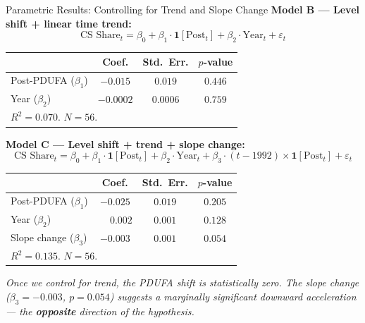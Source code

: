 \documentclass[10pt]{beamer}
\begin{document}
\begin{frame}[t]{Parametric Results: Controlling for Trend and Slope Change}
  \textbf{Model B --- Level shift + linear time trend:}
  \[
    \text{CS Share}_t = \beta_0 + \beta_1 \cdot \mathbf{1}[\text{Post}_t]
                        + \beta_2 \cdot \text{Year}_t + \varepsilon_t
  \]
  \begin{center}
  \begin{tabular}{lccc}
    \hline
    & Coef. & Std.\ Err. & $p$-value \\
    \hline
    Post-PDUFA ($\beta_1$) & $-0.015$ & $0.019$ & $0.446$ \\
    Year ($\beta_2$)       & $-0.0002$ & $0.0006$ & $0.759$ \\
    \hline
    \multicolumn{4}{l}{$R^2 = 0.070$. $N = 56$.} \\
  \end{tabular}
  \end{center}

  \smallskip
  \textbf{Model C --- Level shift + trend + slope change:}
  \[
    \text{CS Share}_t = \beta_0 + \beta_1 \cdot \mathbf{1}[\text{Post}_t]
                        + \beta_2 \cdot \text{Year}_t
                        + \beta_3 \cdot (t - 1992) \times \mathbf{1}[\text{Post}_t]
                        + \varepsilon_t
  \]
  \begin{center}
  \begin{tabular}{lccc}
    \hline
    & Coef. & Std.\ Err. & $p$-value \\
    \hline
    Post-PDUFA ($\beta_1$)  & $-0.025$ & $0.019$ & $0.205$ \\
    Year ($\beta_2$)         & $\phantom{-}0.002$ & $0.001$ & $0.128$ \\
    Slope change ($\beta_3$) & $-0.003$ & $0.001$ & $0.054$ \\
    \hline
    \multicolumn{4}{l}{$R^2 = 0.135$. $N = 56$.} \\
  \end{tabular}
  \end{center}

  \smallskip
  \textit{Once we control for trend, the PDUFA shift is statistically zero.
  The slope change ($\beta_3 = -0.003$, $p = 0.054$) suggests a marginally
  significant \textit{downward} acceleration --- the \textbf{opposite} direction
  of the hypothesis.}
\end{frame}
\end{document}
